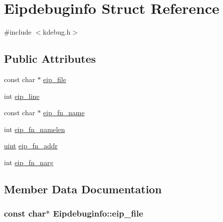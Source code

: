 \hypertarget{structEipdebuginfo}{}\section{Eipdebuginfo Struct Reference}
\label{structEipdebuginfo}


{\ttfamily \#include $<$kdebug.\+h$>$}

\subsection*{Public Attributes}
\begin{DoxyCompactItemize}
\item 
const char $\ast$ \hyperlink{structEipdebuginfo_a99b3b41ad2ea9528df161222af62321a}{eip\+\_\+file}
\item 
int \hyperlink{structEipdebuginfo_a50c332e0b0310474b13924a4f6e9fdf4}{eip\+\_\+line}
\item 
const char $\ast$ \hyperlink{structEipdebuginfo_a5e8cc118e7d6fd43dfaf6126cb2a4fe0}{eip\+\_\+fn\+\_\+name}
\item 
int \hyperlink{structEipdebuginfo_afacac024e9d624f641169c9bb095b2b6}{eip\+\_\+fn\+\_\+namelen}
\item 
\hyperlink{custom__types_8h_a91ad9478d81a7aaf2593e8d9c3d06a14}{uint} \hyperlink{structEipdebuginfo_a862fd972f792c828e2f2519e57c7f011}{eip\+\_\+fn\+\_\+addr}
\item 
int \hyperlink{structEipdebuginfo_a78772b4f4ca1428fe983cd7778324504}{eip\+\_\+fn\+\_\+narg}
\end{DoxyCompactItemize}


\subsection{Member Data Documentation}
\subsubsection[{\texorpdfstring{eip\+\_\+file}{eip_file}}]{\setlength{\rightskip}{0pt plus 5cm}const char$\ast$ Eipdebuginfo\+::eip\+\_\+file}\hypertarget{structEipdebuginfo_a99b3b41ad2ea9528df161222af62321a}{}\label{structEipdebuginfo_a99b3b41ad2ea9528df161222af62321a}
